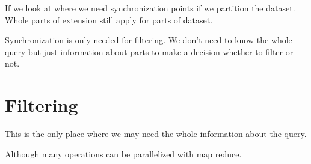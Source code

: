 If we look at where we need synchronization points if we partition 
the dataset. Whole parts of extension still apply for parts of dataset.

Synchronization is only needed for filtering. We don't need to know the 
whole query but just information about parts to make a decision whether to filter or not.

\section{Filtering}

This is the only place where we may need the whole information about the query.

Although many operations can be parallelized with map reduce.



